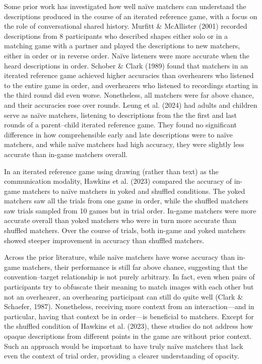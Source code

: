 \documentclass[10pt, letterpaper]{article}
\begin{document}
Some prior work has investigated how well naïve matchers can understand
the descriptions produced in the course of an iterated reference game,
with a focus on the role of conversational shared history. Murfitt \&
McAllister (2001) recorded descriptions from 8 participants who
described shapes either solo or in a matching game with a partner and
played the descriptions to new matchers, either in order or in reverse
order. Naïve listeners were more accurate when the heard descriptions in
order. Schober \& Clark (1989) found that matchers in an iterated
reference game achieved higher accuracies than overhearers who listened
to the entire game in order, and overhearers who listened to recordings
starting in the third round did even worse. Nonetheless, all matchers
were far above chance, and their accuracies rose over rounds. Leung et
al. (2024) had adults and children serve as naïve matchers, listening to
descriptions from the the first and last rounds of a parent--child
iterated reference game. They found no significant difference in how
comprehensible early and late descriptions were to naïve matchers, and
while naïve matchers had high accuracy, they were slightly less accurate
than in-game matchers overall.

In an iterated reference game using drawing (rather than text) as the
communication modality, Hawkins et al. (2023) compared the accuracy of
in-game matchers to naïve matchers in yoked and shuffled conditions. The
yoked matchers saw all the trials from one game in order, while the
shuffled matchers saw trials sampled from 10 games but in trial order.
In-game matchers were more accurate overall than yoked matchers who were
in turn more accurate than shuffled matchers. Over the course of trials,
both in-game and yoked matchers showed steeper improvement in accuracy
than shuffled matchers.

Across the prior literature, while naïve matchers have worse accuracy
than in-game matchers, their performance is still far above chance,
suggesting that the convention--target relationship is not purely
arbitrary. In fact, even when pairs of participants try to obfuscate
their meaning to match images with each other but not an overhearer, an
overhearing participant can still do quite well (Clark \& Schaefer,
1987). Nonetheless, receiving more context from an interaction---and in
particular, having that context be in order---is beneficial to matchers.
Except for the shuffled condition of Hawkins et al. (2023), these
studies do not address how opaque descriptions from different points in
the game are without prior context. Such an approach would be important
to have truly naïve matchers that lack even the context of trial order,
providing a clearer understanding of opacity.
\end{document}
